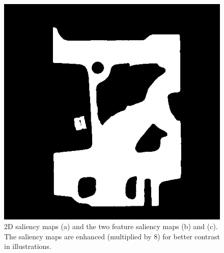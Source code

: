 \begin{figure}
\begin{minipage}{.33\textwidth}
		\subcaption{}
	\end{minipage}~
	\begin{minipage}{.33\textwidth}
		\includegraphics[width=1\linewidth]{images/engine_naive_saliencemap_2_overlap}
		\subcaption{}
	\end{minipage}
	\caption{2D saliency maps (a) and the two feature saliency maps (b) and (c). The saliency maps are enhanced (multiplied by 8) for better contrast in illustrations.}
	\label{fig:engine_naive_saliencemap}
\end{figure}

